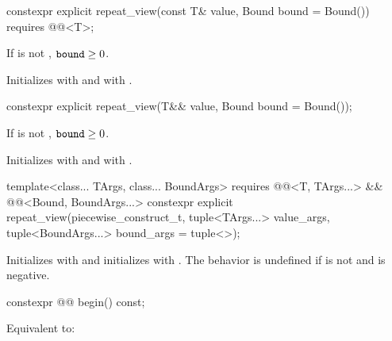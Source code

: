 %
\begin{itemdecl}
constexpr explicit repeat_view(const T& value, Bound bound = Bound())
  requires @@<T>;
\end{itemdecl}

\begin{itemdescr}
\pnum
\expects
If  is not ,
$\tcode{bound} \ge 0$.

\pnum
\effects
Initializes  with  and
 with .
\end{itemdescr}

%
\begin{itemdecl}
constexpr explicit repeat_view(T&& value, Bound bound = Bound());
\end{itemdecl}

\begin{itemdescr}
\pnum
\expects
If  is not , $\tcode{bound} \ge 0$.

\pnum
\effects
Initializes  with  and
 with .
\end{itemdescr}

%
\begin{itemdecl}
template<class... TArgs, class... BoundArgs>
  requires @@<T, TArgs...> &&
           @@<Bound, BoundArgs...>
constexpr explicit repeat_view(piecewise_construct_t,
  tuple<TArgs...> value_args, tuple<BoundArgs...> bound_args = tuple<>{});
\end{itemdecl}

\begin{itemdescr}
\pnum
\effects
Initializes  with
and
initializes\linebreak{}  with
.
The behavior is undefined if
 is not  and
 is negative.
\end{itemdescr}

%
\begin{itemdecl}
constexpr @@ begin() const;
\end{itemdecl}

\begin{itemdescr}
\pnum
\effects
Equivalent to: 
\end{itemdescr}

